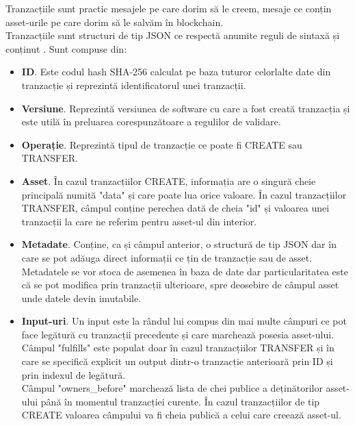 Tranzacțiile sunt practic mesajele pe care dorim să le creem, mesaje ce conțin asset-urile pe care dorim să le salvăm în blockchain. \\

Tranzacțiile sunt structuri de tip JSON ce respectă anumite reguli de sintaxă și conținut \cite{BigchainDB_ReadMe}. Sunt compuse din:
\begin{itemize}
    \item \textbf{ID}. Este codul hash SHA-256 calculat pe baza tuturor celorlalte date din tranzacție și reprezintă identificatorul unei tranzacții.
    
    \item \textbf{Versiune}. Reprezintă versiunea de software cu care a fost creată tranzacția și este utilă în preluarea corespunzătoare a regulilor de validare.
    
    \item \textbf{Operație}. Reprezintă tipul de tranzacție ce poate fi CREATE sau TRANSFER.
    
    \item \textbf{Asset}. În cazul tranzacțiilor CREATE, informația are o singură cheie principală numită "data" și care poate lua orice valoare. În cazul tranzacțiilor TRANSFER, câmpul conține perechea dată de cheia "id" și valoarea unei tranzacții la care ne referim pentru asset-ul din interior.
    
    \item \textbf{Metadate}. Conține, ca și câmpul anterior, o structură de tip JSON dar în care se pot adăuga direct informații ce țin de tranzacție sau de asset. Metadatele se vor stoca de asemenea în baza de date dar particularitatea este că se pot modifica prin tranzacții ulterioare, spre deosebire de câmpul asset unde datele devin imutabile.
    
    \item \textbf{Input-uri}. 
    Un input este la rândul lui compus din mai multe câmpuri ce pot face legătură cu tranzacții precedente și care marchează posesia asset-ului.\\
    
    Câmpul "fulfills" este populat doar în cazul tranzacțiilor TRANSFER și în care se specifică explicit un output dintr-o tranzacție anterioară prin ID și prin indexul de legătură.\\
    
    Câmpul "owners\_before" marchează lista de chei publice a deținătorilor asset-ului până în momentul tranzacției curente. În cazul tranzacțiilor de tip CREATE valoarea câmpului va fi cheia publică a celui care creează asset-ul.\\
    

\end{itemize}

